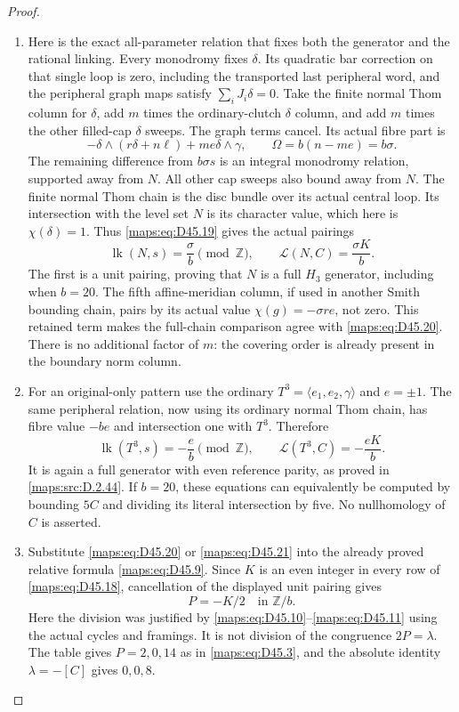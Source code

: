 \begin{proof}
\begin{enumerate}[label=\arabic*.,leftmargin=*]
\item Here is the exact all-parameter relation that fixes
both the generator and the rational linking.
Every monodromy fixes $\delta$. Its quadratic bar
correction on that single loop is zero, including
the transported last peripheral word, and the
peripheral graph maps satisfy $\sum_iJ_i\delta=0$.
Take the finite normal Thom column for $\delta$,
add $m$ times the ordinary-clutch $\delta$ column,
and add $m$ times the other filled-cap $\delta$ sweeps.
The graph terms cancel. Its actual fibre part is
\[
 -\delta\wedge(r\delta+n\ell)+me\delta\wedge\gamma,
 \qquad \Omega=b(n-me)=b\sigma.                            \tag{D45.19}\label{maps:eq:D45.19}
\]
The remaining difference from $b\sigma s$ is an
integral monodromy relation, supported away from $N$.
All other cap sweeps also bound away from $N$.
The finite normal Thom chain is the disc bundle
over its actual central loop. Its intersection
with the level set $N$ is its character value,
which here is $\chi(\delta)=1$.
Thus \eqref{maps:eq:D45.19} gives the actual pairings
\[
 \operatorname{lk}(N,s)=\frac{\sigma}{b}\pmod{\mathbb Z},
 \qquad \mathcal L(N,C)=\frac{\sigma K}{b}.                 \tag{D45.20}\label{maps:eq:D45.20}
\]
The first is a unit pairing, proving that $N$ is a
full $H_3$ generator, including when $b=20$.
The fifth affine-meridian column, if used in another
Smith bounding chain, pairs by its actual value
$\chi(g)=-\sigma re$, not zero. This retained term
makes the full-chain comparison agree with \eqref{maps:eq:D45.20}.
There is no additional factor of $m$: the covering
order is already present in the boundary norm column.

\item For an original-only pattern use the ordinary
$T^3=\langle e_1,e_2,\gamma\rangle$ and $e=\pm1$.
The same peripheral relation, now using its ordinary
normal Thom chain, has fibre value $-be$ and
intersection one with $T^3$. Therefore
\[
 \operatorname{lk}(T^3,s)=-\frac e b\pmod{\mathbb Z},
 \qquad \mathcal L(T^3,C)=-\frac{eK}{b}.                    \tag{D45.21}\label{maps:eq:D45.21}
\]
It is again a full generator with even reference parity,
as proved in \ref{maps:src:D.2.44}. If $b=20$, these equations can
equivalently be computed by bounding $5C$ and dividing
its literal intersection by five. No nullhomology
of $C$ is asserted.

\item Substitute \eqref{maps:eq:D45.20} or \eqref{maps:eq:D45.21} into the already
proved relative formula \eqref{maps:eq:D45.9}. Since $K$ is an
even integer in every row of \eqref{maps:eq:D45.18}, cancellation
of the displayed unit pairing gives
\[
                       P=-K/2\quad\text{in }\mathbb Z/b.
                                                               \tag{D45.22}\label{maps:eq:D45.22}
\]
Here the division was justified by \eqref{maps:eq:D45.10}--\eqref{maps:eq:D45.11}
using the actual cycles and framings. It is not
division of the congruence $2P=\lambda$.
The table gives $P=2,0,14$ as in \eqref{maps:eq:D45.3}, and the
absolute identity $\lambda=-[C]$ gives $0,0,8$.


\end{enumerate}
\end{proof}
